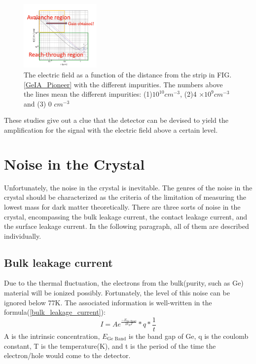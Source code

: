 \documentclass[%
 reprint,
 amsmath,amssymb,
 aps,
]{revtex4-2}
\begin{document}
\begin{figure}[h]
 \centering
 \includegraphics[width=0.35\textwidth]{SHEME/Avalanche_Reach_Through.png}
 \caption{The electric field as a function of the distance from the strip in FIG.\ref{GeIA_Pioneer} with the different impurities. The numbers above the lines mean the different impurities: (1)$10^{10} cm^{-3}$, (2)4 $\times 10^{9} cm^{-3}$ and (3) 0 $cm^{-3}$}
 \label{Avalanche_Reach_Through}
\end{figure}

These studies give out a clue that the detector can be devised to yield the amplification for the signal with the electric field above a certain level.

\section{\label{sec:level3}Noise in the Crystal}
Unfortunately, the noise in the crystal is inevitable. The genres of the noise in the crystal should be characterized as the criteria of the limitation of measuring the lowest mass for dark matter theoretically. 
There are three sorts of noise in the crystal, encompassing the bulk leakage current, the contact leakage current, and the surface leakage current. In the following paragraph, all of them are described individually.\\

\subsection{Bulk leakage current}
Due to the thermal fluctuation, the electrons from the bulk(purity, such as Ge) material will be ionized possibly. Fortunately, the level of this noise can be ignored below 77K. The associated information is well-written in the formula(\ref{bulk_leakage_current})\cite{doi:10.1063/1.4953147}:
\begin{equation}\label{bulk_leakage_current}
I = A e^{\frac{-E_{\text{Ge Band}}}{2k_{B}T}}*q*\frac{1}{t}
\end{equation}
A is the intrinsic concentration, $E_{\text{Ge Band}}$ is the band gap of Ge, q is the coulomb constant, T is the  temperature(K), and t is the period of the time the electron/hole would come to the detector.
\end{document}
